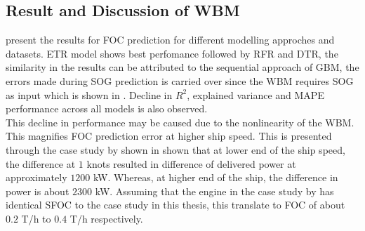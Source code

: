 \subsection{Result and Discussion of WBM}\label{sec:WBM_result_discussion}

 present the results for FOC prediction for different modelling approches and datasets. ETR model shows best perfomance followed by RFR and DTR, the similarity in the results can be attributed to the sequential approach of GBM, the errors made during SOG prediction is carried over since the WBM requires SOG as input which is shown in . Decline in $R^2$, explained variance and MAPE performance across all models is also observed.\\ 

This decline in performance may be caused due to the nonlinearity of the WBM. This magnifies FOC prediction error at higher ship speed. This is presented through the case study by  shown in  shown that at lower end of the ship speed, the difference at $1$ knots resulted in difference of delivered power at approximately $1200$ kW. Whereas, at higher end of the ship, the difference in power is about $2300$ kW. Assuming that the engine in the case study by  has identical SFOC to the case study in this thesis, this translate to FOC of about $0.2$ T/h to $0.4$ T/h respectively. \\
